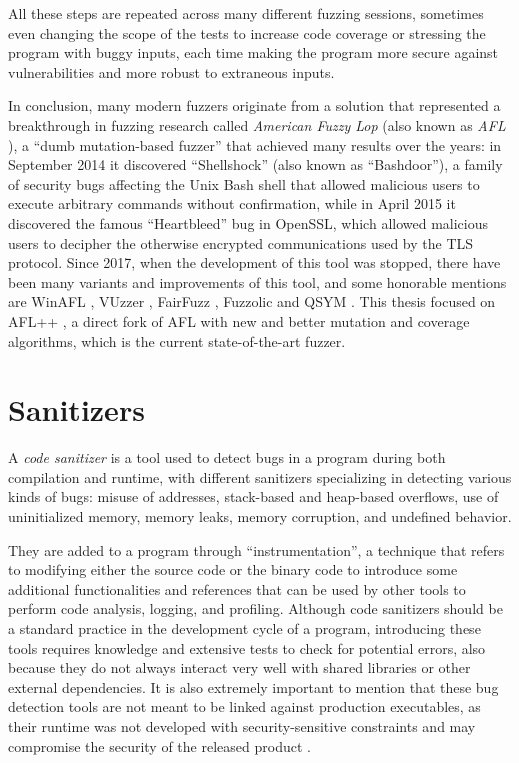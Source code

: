 All these steps are repeated across many different fuzzing sessions, sometimes even changing the scope of the tests to increase code coverage or stressing the program with buggy inputs, each time making the program more secure against vulnerabilities and more robust to extraneous inputs. 

In conclusion, many modern fuzzers originate from a solution that represented a breakthrough in fuzzing research called \textit{American Fuzzy Lop} (also known as \textit{AFL} \cite{afl}), a ``dumb mutation-based fuzzer'' that achieved many results over the years: in September 2014 it discovered ``Shellshock'' \cite{shellshock} (also known as ``Bashdoor''), a family of security bugs affecting the Unix Bash shell that allowed malicious users to execute arbitrary commands without confirmation, while in April 2015 it discovered the famous ``Heartbleed'' \cite{heartbleed} bug in OpenSSL, which allowed malicious users to decipher the otherwise encrypted communications used by the TLS protocol.
Since 2017, when the development of this tool was stopped, there have been many variants and improvements of this tool, and some honorable mentions are WinAFL \cite{winafl}, VUzzer \cite{vuzzer}, FairFuzz \cite{fairfuzz}, Fuzzolic \cite{fuzzolic} and QSYM \cite{qsym}. This thesis focused on AFL++ \cite{AFL++}, a direct fork of AFL with new and better mutation and coverage algorithms, which is the current state-of-the-art fuzzer.










\newpage
\section{Sanitizers} \label{sanitizers}
A \textit{code sanitizer} is a tool used to detect bugs in a program during both compilation and runtime, with different sanitizers specializing in detecting various kinds of bugs: misuse of addresses, stack-based and heap-based overflows, use of uninitialized memory, memory leaks, memory corruption, and undefined behavior.

They are added to a program through ``instrumentation'', a technique that refers to modifying either the source code or the binary code to introduce some additional functionalities and references that can be used by other tools to perform code analysis, logging, and profiling. Although code sanitizers should be a standard practice in the development cycle of a program, introducing these tools requires knowledge and extensive tests to check for potential errors, also because they do not always interact very well with shared libraries or other external dependencies. It is also extremely important to mention that these bug detection tools are not meant to be linked against production executables, as their runtime was not developed with security-sensitive constraints and may compromise the security of the released product \cite{asan_docs}\cite{msan_docs}\cite{ubsan_docs}.

